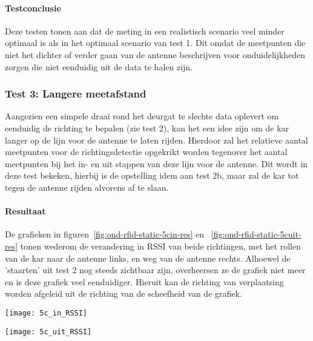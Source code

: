 \paragraph{Testconclusie}
Deze testen tonen aan dat de meting in een realistisch scenario veel minder optimaal is als in het optimaal scenario van test 1. Dit omdat de meetpunten die niet het dichter of verder gaan van de antenne beschrijven voor onduidelijkheden zorgen die niet eenduidig uit de data te halen zijn.

\subsubsection{Test 3: Langere meetafstand}
\label{sec:ond-rfid-3-3}
Aangezien een simpele draai rond het deurgat te slechte data oplevert om eenduidig de richting te bepalen (zie test 2), kan het een idee zijn om de kar langer op de lijn voor de antenne te laten rijden. Hierdoor zal het relatieve aantal meetpunten voor de richtingsdetectie opgekrikt worden tegenover het aantal meetpunten bij het in- en uit stappen van deze lijn voor de antenne. Dit wordt in deze test bekeken, hierbij is de opstelling idem aan test 2b, maar zal de kar tot tegen de antenne rijden alvorens af te slaan.

\paragraph{Resultaat}
De grafieken in figuren~\ref{fig:ond-rfid-static-5cin-res} en ~\ref{fig:ond-rfid-static-5cuit-res} tonen wederom de verandering in RSSI van beide richtingen, met het rollen van de kar naar de antenne links, en weg van de antenne rechts. Alhoewel de 'staarten' uit test 2 nog steeds zichtbaar zijn, overheersen ze de grafiek niet meer en is deze grafiek veel eenduidiger. Hieruit  kan de richting van verplaatsing worden afgeleid uit de richting van de scheefheid van de grafiek.

\begin{minipage}{0.42\textwidth}
	\texttt{[image: 5c\_in\_RSSI]}
	\label{fig:ond-rfid-static-5cin-res}
\end{minipage}
\hfill
\begin{minipage}{0.42\textwidth}
	\texttt{[image: 5c\_uit\_RSSI]}
	\label{fig:ond-rfid-static-5cuit-res}
\end{minipage}

